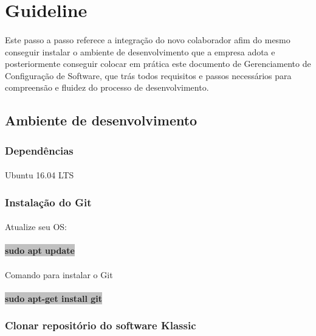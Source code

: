 \documentclass[	DIV=calc,%
							paper=a4,%
							fontsize=12pt,%
							onecolumn]{scrartcl}	 					%
\begin{document}
\section{Guideline}
\paragraph{}
Este passo a passo referece a integração do novo colaborador afim do mesmo conseguir instalar o ambiente de desenvolvimento que a empresa adota e posteriormente conseguir colocar em prática este documento de Gerenciamento de Configuração de Software, que trás todos requisitos e passos necessários para compreensão e fluidez do processo de desenvolvimento.

\subsection{Ambiente de desenvolvimento}
\subsubsection{Dependências}
\paragraph{}
Ubuntu 16.04 LTS

\subsubsection{Instalação do Git}
\paragraph{}
Atualize seu OS:
\paragraph{}
\textbf{\colorbox{Silver}{sudo apt update}}
\paragraph{}
Comando para instalar o Git
\paragraph{}
\textbf{\colorbox{Silver}{sudo apt-get install git}}

\subsubsection{Clonar repositório do software Klassic}
\end{document}
